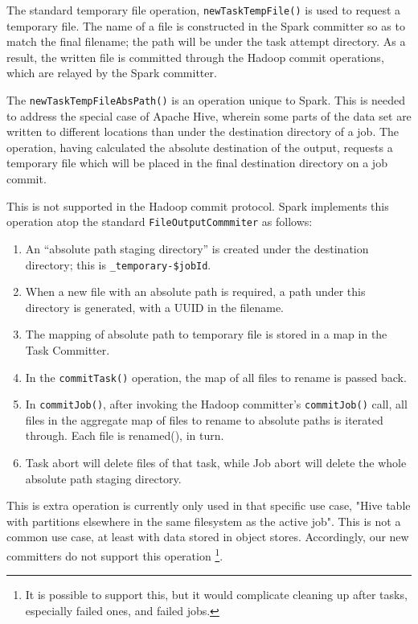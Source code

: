 \documentclass[conference]{IEEEtran}
\begin{document}
The standard temporary file operation, \texttt{newTaskTempFile()} is used
to request a temporary file.
The name of a file is constructed in the Spark committer so as to match the final filename;
the path will be under the task attempt directory.
As a result, the written file is committed through the Hadoop commit operations,
which are relayed by the Spark committer.

The \texttt{newTaskTempFileAbsPath()} is an operation unique to Spark.
This is needed to address the special case of Apache Hive, wherein
some parts of the data set are written to different locations than
under the destination directory of a job.
The operation, having calculated the absolute destination of the output,
requests a temporary file which will be placed in the final destination
directory on a job commit.

This is not supported in the Hadoop commit protocol.
Spark implements this operation atop the standard \texttt{FileOutputCommmiter}
as follows:

\begin{enumerate}
  \item An ``absolute path staging directory'' is created under the destination
  directory;
  this is \texttt{\_temporary-\$jobId}.
  \item When a new file with an absolute path is required, a path under this
  directory is generated, with a UUID in the filename.
  \item The mapping of absolute path to temporary file is stored in a map in the Task Committer.
  \item In the \texttt{commitTask()} operation, the map of all files to rename is passed back.
  \item In \texttt{commitJob()}, after invoking the Hadoop committer's \texttt{commitJob()}
  call, all files in the aggregate map of files to rename to absolute paths is iterated through.
  Each file is renamed(), in turn.
  \item Task abort will delete files of that task, while Job abort will delete
  the whole absolute path staging directory.
\end{enumerate}

This is extra operation is currently only used in that specific use case,
"Hive table with partitions elsewhere in the same filesystem as the active job".
This is not a common use case, at least with data stored in object stores.
Accordingly, our new committers do not support this operation
\footnote{It is possible to support this, but it would complicate cleaning up
after tasks, especially failed ones, and failed jobs.}.
\end{document}
